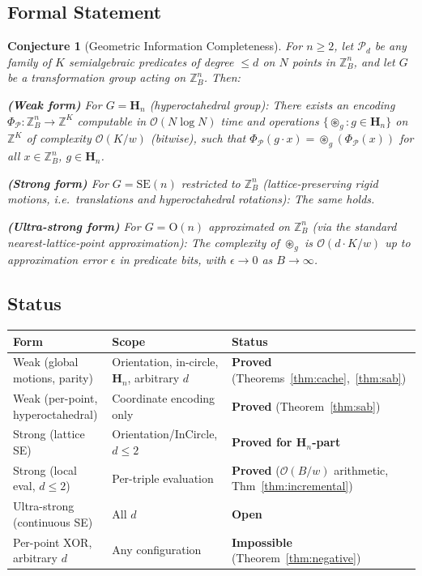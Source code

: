 \documentclass[11pt,letterpaper]{article}
\newtheorem{conjecture}[theorem]{Conjecture}
\newcommand{\ZBd}[1]{\mathbb{Z}_B^{#1}}
\newcommand{\ZZ}{\mathbb{Z}}
\newcommand{\Hn}{\mathbf{H}_n}
\newcommand{\SEn}{\mathrm{SE}(n)}
\newcommand{\PhiP}{\Phi_{\mathcal{P}}}
\newcommand{\cP}{\mathcal{P}}
\newcommand{\cO}{\mathcal{O}}
\newcommand{\oast}{\circledast}
\newcommand{\wt}{w}       %
\begin{document}
\subsection{Formal Statement}

\begin{conjbox}
\begin{conjecture}[Geometric Information Completeness]\label{conj:gic}
For $n\ge 2$, let $\cP_d$ be any family of $K$ semialgebraic predicates of degree
$\le d$ on $N$ points in $\ZBd{n}$, and let $G$ be a transformation group acting on
$\ZBd{n}$.  Then:

\textbf{(Weak form)} For $G=\Hn$ (hyperoctahedral group):
There exists an encoding $\PhiP:\ZBd{n}\to\ZZ^K$ computable in $\cO(N\log N)$ time
and operations $\{\oast_g:g\in\Hn\}$ on $\ZZ^K$ of complexity $\cO(K/\wt)$ (bitwise),
such that $\PhiP(g\cdot x)=\oast_g(\PhiP(x))$ for all $x\in\ZBd{n}$, $g\in\Hn$.

\textbf{(Strong form)} For $G=\SEn$ restricted to $\ZBd{n}$ (lattice-preserving rigid
motions, i.e.\ translations and hyperoctahedral rotations):
The same holds.

\textbf{(Ultra-strong form)} For $G=\mathrm{O}(n)$ approximated on $\ZBd{n}$ (via the
standard nearest-lattice-point approximation):
The complexity of $\oast_g$ is $\cO(d\cdot K/\wt)$ up to approximation error $\epsilon$
in predicate bits, with $\epsilon\to0$ as $B\to\infty$.
\end{conjecture}
\end{conjbox}

\subsection{Status}

\begin{center}
\begin{tabular}{lll}
\toprule
Form & Scope & Status \\
\midrule
Weak (global motions, parity) & Orientation, in-circle, $\Hn$, arbitrary $d$ & \textbf{Proved} (Theorems~\ref{thm:cache},~\ref{thm:sab}) \\
Weak (per-point, hyperoctahedral) & Coordinate encoding only & \textbf{Proved} (Theorem~\ref{thm:sab}) \\
Strong (lattice SE) & Orientation/InCircle, $d\le2$ & \textbf{Proved for $\Hn$-part} \\
Strong (local eval, $d\le2$) & Per-triple evaluation & \textbf{Proved} ($\cO(B/\wt)$ arithmetic, Thm~\ref{thm:incremental}) \\
Ultra-strong (continuous SE) & All $d$ & \textbf{Open} \\
Per-point XOR, arbitrary $d$ & Any configuration & \textbf{Impossible} (Theorem~\ref{thm:negative}) \\
\bottomrule
\end{tabular}
\end{center}
\end{document}
